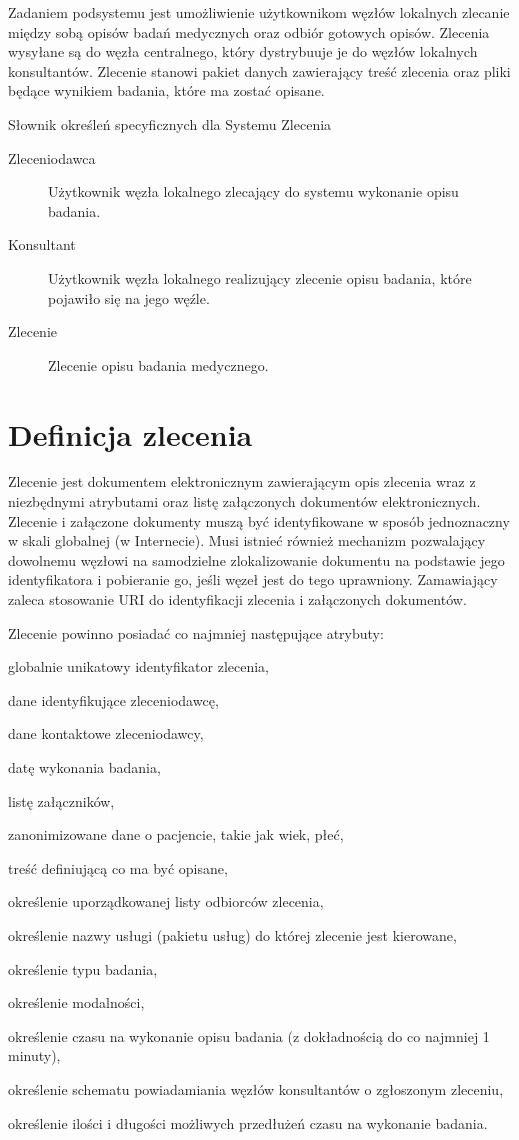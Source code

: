 \documentclass[a4paper]{report}
\begin{document}
Zadaniem podsystemu jest umożliwienie użytkownikom węzłów lokalnych zlecanie między sobą opisów
badań medycznych oraz odbiór gotowych opisów. Zlecenia wysyłane są do węzła centralnego, który
dystrybuuje je do węzłów lokalnych konsultantów. Zlecenie stanowi pakiet danych zawierający
treść zlecenia oraz pliki będące wynikiem badania, które ma zostać opisane. 

Słownik określeń specyficznych dla Systemu Zlecenia
\begin{description}
  \item[Zleceniodawca] Użytkownik węzła lokalnego zlecający do systemu wykonanie opisu badania.
  \item[Konsultant] Użytkownik węzła lokalnego realizujący zlecenie opisu badania, które pojawiło się na jego węźle.
  \item[Zlecenie] Zlecenie opisu badania medycznego.
\end{description}

\section{Definicja zlecenia}

Zlecenie jest dokumentem elektronicznym zawierającym opis zlecenia wraz z niezbędnymi atrybutami oraz listę załączonych dokumentów elektronicznych. Zlecenie i załączone dokumenty muszą być identyfikowane w sposób jednoznaczny w skali globalnej (w Internecie). Musi istnieć również mechanizm pozwalający dowolnemu węzłowi na samodzielne zlokalizowanie dokumentu na podstawie jego identyfikatora i pobieranie go, jeśli węzeł jest do tego uprawniony. Zamawiający zaleca stosowanie URI do identyfikacji zlecenia i załączonych dokumentów.

Zlecenie powinno posiadać co najmniej następujące atrybuty:
\begin{enumerate*}
\item globalnie unikatowy identyfikator zlecenia,
\item dane identyfikujące zleceniodawcę,
\item dane kontaktowe zleceniodawcy,
\item datę wykonania badania,
\item listę załączników,
\item zanonimizowane dane o pacjencie, takie jak wiek, płeć,
\item treść definiującą co ma być opisane,
\item określenie uporządkowanej listy odbiorców zlecenia,
\item określenie nazwy usługi (pakietu usług) do której zlecenie jest kierowane,
\item określenie typu badania,
\item określenie modalności,
\item określenie czasu na wykonanie opisu badania (z dokładnością do co najmniej 1 minuty),
\item określenie schematu powiadamiania węzłów konsultantów o zgłoszonym zleceniu,
\item określenie ilości i długości możliwych przedłużeń czasu na wykonanie badania.
\end{enumerate*}
\end{document}
